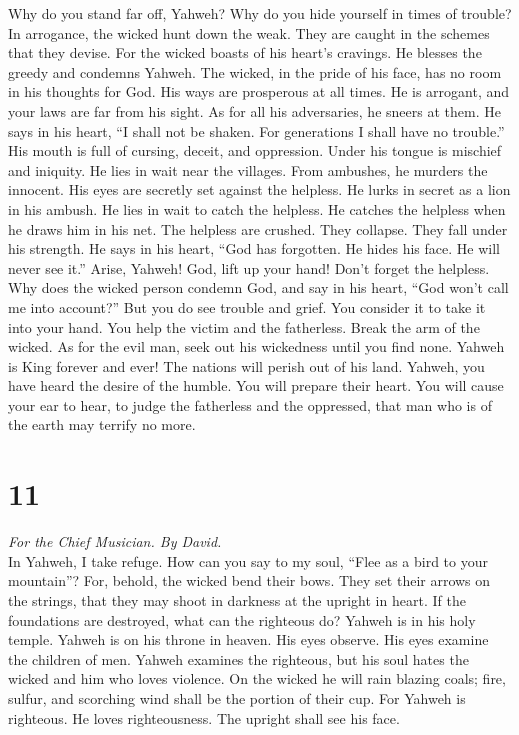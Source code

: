  Why do you stand far off, Yahweh? Why do you hide
yourself in times of trouble?  In arrogance, the wicked
hunt down the weak. They are caught in the schemes that they devise.
 For the wicked boasts of his heart's cravings. He blesses
the greedy and condemns Yahweh.  The wicked, in the pride
of his face, has no room in his thoughts for God.  His
ways are prosperous at all times. He is arrogant, and your laws are far
from his sight. As for all his adversaries, he sneers at them.
 He says in his heart, ``I shall not be shaken. For
generations I shall have no trouble.''  His mouth is full
of cursing, deceit, and oppression. Under his tongue is mischief and
iniquity.  He lies in wait near the villages. From
ambushes, he murders the innocent. His eyes are secretly set against the
helpless.  He lurks in secret as a lion in his ambush. He
lies in wait to catch the helpless. He catches the helpless when he
draws him in his net.  The helpless are crushed. They
collapse. They fall under his strength.  He says in his
heart, ``God has forgotten. He hides his face. He will never see it.''
 Arise, Yahweh! God, lift up your hand! Don't forget the
helpless.  Why does the wicked person condemn God, and
say in his heart, ``God won't call me into account?'' 
But you do see trouble and grief. You consider it to take it into your
hand. You help the victim and the fatherless.  Break the
arm of the wicked. As for the evil man, seek out his wickedness until
you find none.  Yahweh is King forever and ever! The
nations will perish out of his land.  Yahweh, you have
heard the desire of the humble. You will prepare their heart. You will
cause your ear to hear,  to judge the fatherless and the
oppressed, that man who is of the earth may terrify no more.

\hypertarget{section-10}{%
\section{11}\label{section-10}}

\emph{For the Chief Musician. By David.}\\
 In Yahweh, I take refuge. How can you say to my soul,
``Flee as a bird to your mountain''?  For, behold, the
wicked bend their bows. They set their arrows on the strings, that they
may shoot in darkness at the upright in heart.  If the
foundations are destroyed, what can the righteous do? 
Yahweh is in his holy temple. Yahweh is on his throne in heaven. His
eyes observe. His eyes examine the children of men. 
Yahweh examines the righteous, but his soul hates the wicked and him who
loves violence.  On the wicked he will rain blazing coals;
fire, sulfur, and scorching wind shall be the portion of their cup.
 For Yahweh is righteous. He loves righteousness. The
upright shall see his face.

